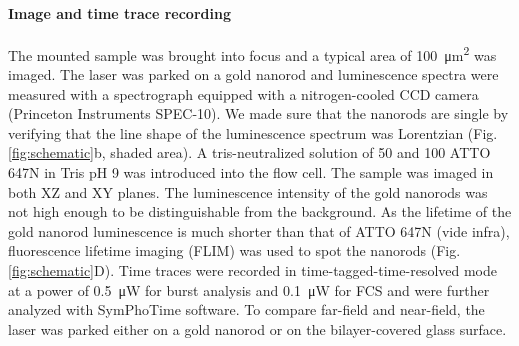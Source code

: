 \paragraph*{Image and time trace recording}
The mounted sample was brought into focus and a typical area of \SI{100}{\um\squared} was imaged.
The laser was parked on a gold nanorod and luminescence spectra were measured with a spectrograph equipped with a nitrogen-cooled CCD camera (Princeton Instruments SPEC-10).
We made sure that the nanorods are single by verifying that the line shape of the luminescence spectrum was Lorentzian (Fig. \ref{fig:schematic}b, shaded area).
A tris-neutralized solution of \SI{50}{\pM} and \SI{100}{\nM} ATTO 647N in Tris pH 9 was introduced into the flow cell.
The sample was imaged in both XZ and XY planes.
The luminescence intensity of the gold nanorods was not high enough to be distinguishable from the background.
As the lifetime of the gold nanorod luminescence is much shorter than that of ATTO 647N (vide infra), fluorescence lifetime imaging (FLIM) was used to spot the nanorods (Fig. \ref{fig:schematic}D).
Time traces were recorded in time-tagged-time-resolved mode at a power of \SI{0.5}{\uW} for burst analysis and \SI{0.1}{\uW} for FCS and were further analyzed with SymPhoTime software. 
To compare far-field and near-field, the laser was parked either on a gold nanorod or on the bilayer-covered glass surface.


